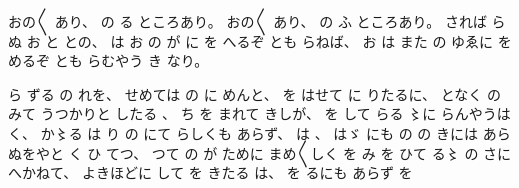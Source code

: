 
%
おの〳〵
あり、
%
の
る
ところあり。
%
おの〳〵
あり、%
%
の%
ふ
ところあり。
%
されば
らぬ
お
と
との、
%
は
お
の
が
に
を
へるぞ
とも
らねば、
%
お
は
また
の
ゆゑに
を
めるぞ
とも
らむやう
き
なり。

%
ら
ずる
の
れを、
%
せめては
の
に
めんと、
%
を
はせて
に
りたるに、
%
となく
の
みて
うつかりと
したる
、
%
ち
を
まれて
きしが、
%
を%
して
らる%
%
〻に%
らんやうは
く、
%
か〻る%
は
り
の
にて
らしくも
あらず、
%
は
、
%
はゞ%
にも
の%
の
きには
あらぬをやと
く
ひ
てつ、
%
つて
の
が
ために
まめ〳〵しく
を
み%
を
ひて
る〻%
の
さに
へかねて、
%
よきほどに
して
を
きたる
は、
%
を
るにも
あらず
を%
